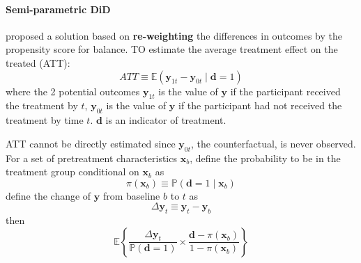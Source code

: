 \documentclass[twoside]{article}
\begin{document}
\paragraph*{Semi-parametric DiD}
\citet{abadie2005semiparametric} proposed a solution based on \textbf{re-weighting} the differences in outcomes by the propensity score for balance. TO estimate the average treatment effect on the treated (ATT):
\begin{equation*}
    ATT\equiv \mathbb{E}\left(\mathbf{y}_{1t}-\mathbf{y}_{0t}\mid \mathbf{d}=1\right)
\end{equation*}
where the 2 potential outcomes $\mathbf{y}_{1t}$ is the value of $\mathbf{y}$ if the participant received the treatment by $t$, $\mathbf{y}_{0t}$ is the value of $\mathbf{y}$ if the participant had not received the treatment by time $t$. $\mathbf{d}$ is an indicator of treatment.

ATT cannot be directly estimated since $\mathbf{y}_{0t}$, the counterfactual, is never observed. For a set of pretreatment characteristics $\mathbf{x}_{b}$, define the probability to be in the treatment group conditional on $\mathbf{x}_b$ as $$ \pi\left(\mathbf{x}_b\right)\equiv \mathbb{P}\left(\mathbf{d}=1\mid \mathbf{x}_b\right) $$
define the change of $\mathbf{y}$ from baseline $b$ to $t$ as $$\Delta \mathbf{y}_t \equiv \mathbf{y}_t - \mathbf{y}_b $$
then
\begin{equation*}
    \mathbb{E}\left\{ \frac{\Delta \mathbf{y}_t}{\mathbb{P}\left(\mathbf{d}=1\right)} \times \frac{\mathbf{d}-\pi\left(\mathbf{x}_b\right)}{1-\pi\left(\mathbf{x}_b\right)} \right\}
\end{equation*}

\newpage


\end{document}
